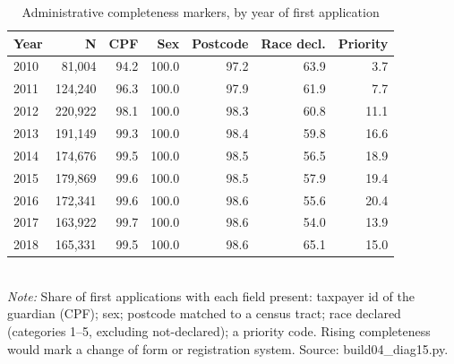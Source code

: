 \begin{table}[htbp]\centering
\caption{Administrative completeness markers, by year of first application}
\label{tab:D15_C_marcadores}
\small
\begin{tabular}{lrrrrrr}
\toprule
Year & N & CPF & Sex & Postcode & Race decl. & Priority \\
\midrule
2010 & 81,004 & 94.2 & 100.0 & 97.2 & 63.9 & 3.7 \\
2011 & 124,240 & 96.3 & 100.0 & 97.9 & 61.9 & 7.7 \\
2012 & 220,922 & 98.1 & 100.0 & 98.3 & 60.8 & 11.1 \\
2013 & 191,149 & 99.3 & 100.0 & 98.4 & 59.8 & 16.6 \\
2014 & 174,676 & 99.5 & 100.0 & 98.5 & 56.5 & 18.9 \\
2015 & 179,869 & 99.6 & 100.0 & 98.5 & 57.9 & 19.4 \\
2016 & 172,341 & 99.6 & 100.0 & 98.6 & 55.6 & 20.4 \\
2017 & 163,922 & 99.7 & 100.0 & 98.6 & 54.0 & 13.9 \\
2018 & 165,331 & 99.5 & 100.0 & 98.6 & 65.1 & 15.0 \\
\bottomrule
\end{tabular}
\\[3pt]{\footnotesize \textit{Note:} Share of first applications with each field present: taxpayer id of the guardian (CPF); sex; postcode matched to a census tract; race declared (categories 1--5, excluding not-declared); a priority code. Rising completeness would mark a change of form or registration system. Source: build04\_diag15.py.}
\end{table}
